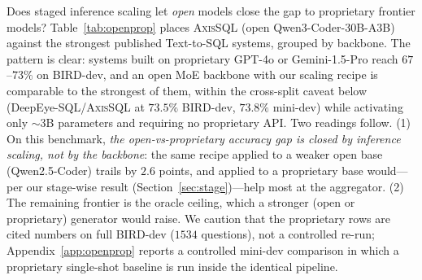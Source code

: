 \documentclass{article}
\newcommand{\sys}{\textsc{AxisSQL}\xspace}
\begin{document}
Does staged inference scaling let \emph{open} models close the gap to proprietary frontier models? Table~\ref{tab:openprop} places \sys{} (open Qwen3-Coder-30B-A3B) against the strongest published Text-to-SQL systems, grouped by backbone. The pattern is clear: systems built on proprietary GPT-4o or Gemini-1.5-Pro reach $67$--$73\%$ on BIRD-dev, and an open MoE backbone with our scaling recipe is comparable to the strongest of them, within the cross-split caveat below (DeepEye-SQL/\sys{} at $73.5\%$ BIRD-dev, $73.8\%$ mini-dev) while activating only $\sim$3B parameters and requiring no proprietary API. Two readings follow. (1) On this benchmark, \emph{the open-vs-proprietary accuracy gap is closed by inference scaling, not by the backbone}: the same recipe applied to a weaker open base (Qwen2.5-Coder) trails by $2.6$ points, and applied to a proprietary base would---per our stage-wise result (Section~\ref{sec:stage})---help most at the aggregator. (2) The remaining frontier is the oracle ceiling, which a stronger (open or proprietary) generator would raise. We caution that the proprietary rows are cited numbers on full BIRD-dev ($1534$ questions), not a controlled re-run; Appendix~\ref{app:openprop} reports a controlled mini-dev comparison in which a proprietary single-shot baseline is run inside the identical pipeline.
\end{document}
